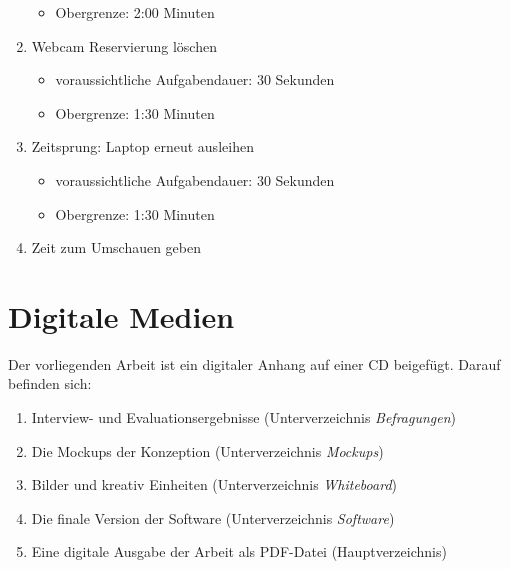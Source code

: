 \begin{enumerate}
\begin{itemize}
                \item Obergrenze: 2:00 Minuten
            \end{itemize}
    \item Webcam Reservierung löschen
            \begin{itemize}
                \item voraussichtliche Aufgabendauer: 30 Sekunden
                \item Obergrenze: 1:30 Minuten
            \end{itemize}
    \item Zeitsprung: Laptop erneut ausleihen
            \begin{itemize}
                \item voraussichtliche Aufgabendauer: 30 Sekunden
                \item Obergrenze: 1:30 Minuten
            \end{itemize}
    \item Zeit zum Umschauen geben
\end{enumerate}

\section{Digitale Medien}
Der vorliegenden Arbeit ist ein digitaler Anhang auf einer CD beigefügt. Darauf befinden sich:
{\begin{enumerate}
    \item Interview- und Evaluationsergebnisse (Unterverzeichnis \textit{Befragungen})
    \item Die Mockups der Konzeption (Unterverzeichnis \textit{Mockups})
    \item Bilder und kreativ Einheiten (Unterverzeichnis \textit{Whiteboard})
    \item Die finale Version der Software (Unterverzeichnis \textit{Software})
    \item Eine digitale Ausgabe der Arbeit als PDF-Datei (Hauptverzeichnis)
\end{enumerate}}